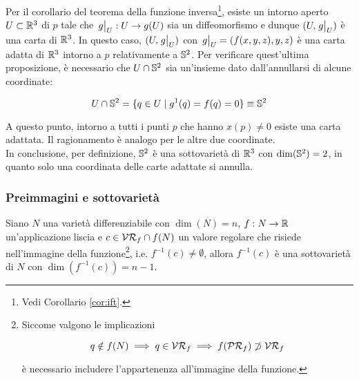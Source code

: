 Per il corollario del teorema della funzione inversa\footnote{%
	Vedi Corollario \ref{cor:ift}.%
}, esiste un intorno aperto $ U \subset \R^{3} $ di $ p $ tale che $ \eval{g}_{U} : U \to g(U) $ sia un diffeomorfismo e dunque $ (U,\eval{g}_{U}) $ è una carta di $ \R^{3} $. In questo caso, $ (U,\eval{g}_{U}) $ con $ \eval{g}_{U} = (f(x,y,z),y,z) $ è una carta adatta di $ \R^{3} $ intorno a $ p $ relativamente a $ \S^{2} $. Per verificare quest'ultima proposizione, è necessario che $ U \cap \S^{2} $ sia un'insieme dato dall'annullarsi di alcune coordinate:

\begin{equation}
	U \cap \S^{2} = \{ q \in U \mid g^{1}(q) = f(q) = 0 \} \equiv \S^{2}
\end{equation}

A questo punto, intorno a tutti i punti $ p $ che hanno $ x(p) \neq 0 $ esiste una carta adattata. Il ragionamento è analogo per le altre due coordinate. \\
In conclusione, per definizione, $ \S^{2}$ è una sottovarietà di $\R^{3} $ con $ \dim(\S^{2}) = 2 $, in quanto solo una coordinata delle carte adattate si annulla.

\subsubsection{Preimmagini e sottovarietà}

\begin{theorem}[Preimmagine di un valore regolare (caso $ M = \R $)]
	Siano $ N $ una varietà differenziabile con $ \dim(N) = n $, $ f : N \to \R $ un'applicazione liscia e $ c \in \VR_{f} \cap f(N) $ un valore regolare che risiede nell'immagine della funzione\footnote{%
		Siccome valgono le implicazioni
		
		\begin{equation*}
			q \notin f(N) \implies q \in \VR_{f} \implies f(\PR_{f}) \not\supset \VR_{f}
		\end{equation*}
	
		è necessario includere l'appartenenza all'immagine della funzione.%
	}, i.e. $ f^{-1}(c) \neq \emptyset $, allora $ f^{-1}(c) $ è una sottovarietà di $ N $ con $ \dim(f^{-1}(c)) = n-1 $.
\end{theorem}

